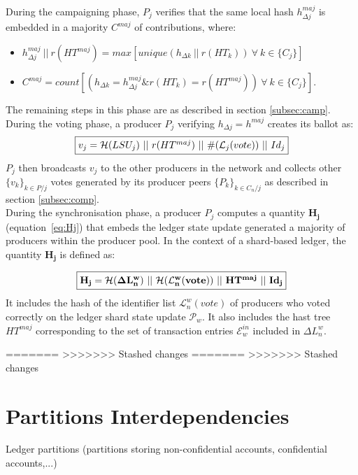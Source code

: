 During the campaigning phase, $P_j$ verifies that the same local hash $h^{maj}_{\Delta j}$ is embedded in a majority $C^{maj}$ of contributions, where:
\begin{itemize}
\item $h^{maj}_{\Delta j}~||~r(HT^{maj}) = max[unique(h_{\Delta k}~||~r(HT_k))~\forall~k\in\{C_j\}]$
\item $C^{maj} = count[(h_{\Delta k} = h^{maj}_{\Delta j} \& r(HT_k) = r(HT^{maj}))~\forall~k\in\{C_j\}]$. 
\end{itemize}

The remaining steps in this phase are as described in section \ref{subsec:camp}.\\

During the voting phase, a producer $P_j$ verifying $h_{\Delta j}=h^{maj}$ creates its ballot as:
\begin{equation}
\label{eq:vj_shard}
\fbox{$v_j = \mathcal{H}(LSU_j)~||~r(HT^{maj})~||~\#(\mathcal{L}_j(vote))~||~Id_j$}
\end{equation}
$P_j$ then broadcasts $v_j$ to the other producers in the network and collects other $\{v_k\}_{k \in P/j}$ votes generated by its producer peers $\{P_k\}_{k \in C_n/j}$ as described in section \ref{subsec:comp}.\\

During the synchronisation phase, a producer $P_j$ computes a quantity $\mathbf{H_{j}}$ (equation~\eqref{eq:Hj}) that embeds the ledger state update generated a majority of producers within the producer pool. In the context of a shard-based ledger, the  quantity $\mathbf{H_{j}}$ is defined as:

 \begin{equation} 
\fbox{$\mathbf{H_{j} = \mathcal{H}(\Delta L^w_n)~||~\mathcal{H}(\mathcal{L}^{w}_{n}(vote))~||~HT^{maj}~||~Id_j}$}
\label{eq:Hj_shard}
\end{equation}
It includes the hash of the identifier list $\mathcal{L}^{w}_{n}(vote)$ of producers who voted correctly on the ledger shard state update $\mathcal{P}_w$.
It also includes the hast tree $HT^{maj}$ corresponding to the set of transaction entries $\mathcal{E}^{in}_w$ included in $\Delta L^w_n$. 


=======
>>>>>>> Stashed changes
=======
>>>>>>> Stashed changes
\section{Partitions Interdependencies}

Ledger partitions (partitions storing non-confidential accounts, confidential accounts,...)